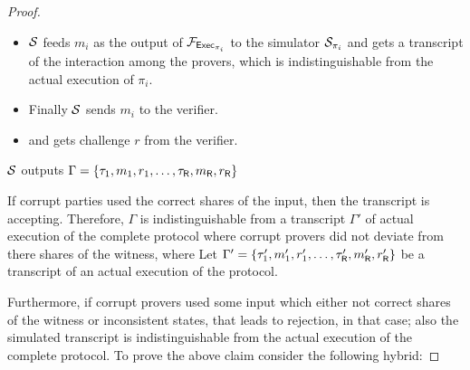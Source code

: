 \begin{proof}
\begin{itemize}
		\item $\mathcal{S}$ feeds $m_i$ as the output of $\mathcal{F}_{\mathsf{Exec}_{\pi_i}}$ to the simulator $\mathcal{S}_{\pi_i}$ and gets a transcript of the interaction among the provers, which is indistinguishable from the actual execution of $\pi_i$.
		\item Finally $\mathcal{S}$ sends $m_i$ to the verifier.
		\item and gets challenge $r$ from the verifier.
	\end{itemize}
	$\mathcal{S}$ outputs $\Gamma = \{\tau_1, m_1 ,r_1, \ldots, \tau_{\mathsf{R}}, m_{\mathsf{R}}, r_{\mathsf{R}} \}$ 
	
	\noindent If corrupt parties used the correct shares of the input, then the transcript is accepting. Therefore, $\Gamma$ is indistinguishable from a transcript $\Gamma'$ of actual execution of the complete protocol where corrupt provers did not deviate from there shares of the witness, where
	Let $\Gamma' = \{\tau'_1, m'_1 ,r'_1, \ldots, \tau'_{\mathsf{R}}, m'_{\mathsf{R}}, r'_{\mathsf{R}} \}$ be a transcript of an actual execution of the protocol.
	
	Furthermore, if corrupt provers used some input which either not correct shares of the witness or inconsistent states, that leads to rejection, in that case; also the simulated transcript is indistinguishable from the actual execution of the complete protocol.
	To prove the above claim consider the following hybrid: 
	

\end{proof}
